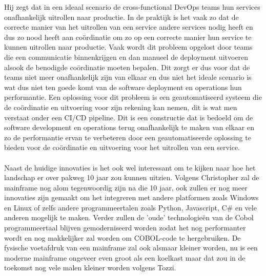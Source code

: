 Hij zegt dat in een ideaal scenario de cross-functional DevOps teams hun services onafhankelijk uitrollen naar productie.
In de praktijk is het vaak zo dat de correcte manier van het uitrollen van een service andere services nodig heeft en dus zo nood heeft aan coördinatie om zo op een correcte manier hun service te kunnen uitrollen naar productie.
Vaak wordt dit probleem opgelost door teams die een communicatie binnenkrijgen en dan manueel de deployment uitvoeren alsook de benodigde coördinatie moeten bepalen.
Dit zorgt er dus voor dat de teams niet meer onafhankelijk zijn van elkaar en dus niet het ideale scenario is wat dus niet ten goede komt van de software deployment en operations hun performantie.
Een oplossing voor dit probleem is een geautomatiseerd systeem die de coördinatie en uitvoering voor zijn rekening kan nemen, dit is wat men verstaat onder een CI/CD pipeline.
Dit is een constructie dat is bedoeld om de software development en operations terug onafhankelijk te maken van elkaar en zo de performantie ervan te verbeteren door een geautomatiseerde oplossing te bieden voor de coördinatie en uitvoering voor het uitrollen van een service. \autocite{Sokolowksi2021}
\\ \\
Naast de huidige innovaties is het ook wel interessant om te kijken naar hoe het landschap er over pakweg 10 jaar zou kunnen uitzien.
Volgens Christopher \textcite{Tozzi2022} zal de mainframe nog alom tegenwoordig zijn na die 10 jaar, ook zullen er nog meer innovaties zijn gemaakt om het integreren met andere platformen zoals Windows en Linux of zelfs andere programmeertalen zoals Python,
Javascript, C# en vele anderen mogelijk te maken.
Verder zullen de 'oude' technologieën van de Cobol programmeertaal blijven gemoderniseerd worden zodat het nog performanter wordt en nog makkelijker zal worden om COBOL-code te hergebruiken. De fysische voetafdruk van een mainframe zal ook alsmaar kleiner worden,
nu is een moderne mainframe ongeveer even groot als een koelkast maar dat zou in de toekomst nog vele malen kleiner worden volgens Tozzi. \autocite{Tozzi2022}




